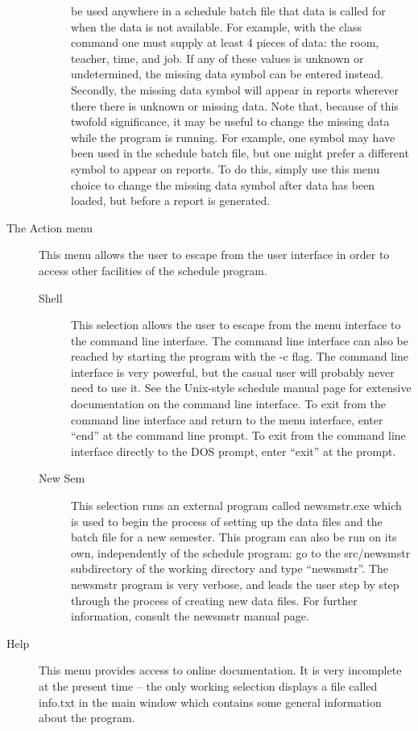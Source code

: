 \begin{description}
\begin{description}
be used anywhere in a schedule batch file that data is called for when the
data is not available. For example, with the class command one must supply
at least 4 pieces of data: the room, teacher, time, and job. If any of these
values is unknown or undetermined, the missing data symbol can be entered
instead. Secondly, the missing data symbol will appear in reports wherever
there there is unknown or missing data. Note that, because of this twofold
significance, it may be useful to change the missing data while the program
is running. For example, one symbol may have been used in the schedule batch
file, but one might prefer a different symbol to appear on reports. To do
this, simply use this menu choice to change the missing data symbol after data
has been loaded, but before a report is generated.  
\end{description}
\item[The Action menu] This menu allows the user to escape from the user
interface in order to access other facilities of the schedule program. 
\begin{description}
\item[Shell] This selection allows the user to escape from the menu interface
to the command line interface. The command line interface can also be
reached by starting the program with the -c flag. The command line interface
is very powerful, but the casual user will probably never need to use it.
See the Unix-style schedule manual page for extensive documentation on the 
command line interface. To exit from the command line interface and return
to the menu interface, enter ``end'' at the command line prompt. To exit
from the command line interface directly to the DOS prompt, enter ``exit'' at
the prompt. 
\item[New Sem] This selection runs an external program called newsmstr.exe
which is used to begin the process of setting up the data files and the batch
file for a new semester. This program can also be run on its own, independently
of the schedule program: go to the src/newsmstr subdirectory of the
working directory and type ``newsmstr''. The newsmstr program is very verbose,
and leads the user step by step through the process of creating new data
files. For further information, consult the newsmstr manual page. 
\end{description}
\item[Help] This menu provides access to online documentation. It is very
incomplete at the present time -- the only working selection displays a file
called info.txt in the main window which contains some general information
about the program.
\end{description} 

